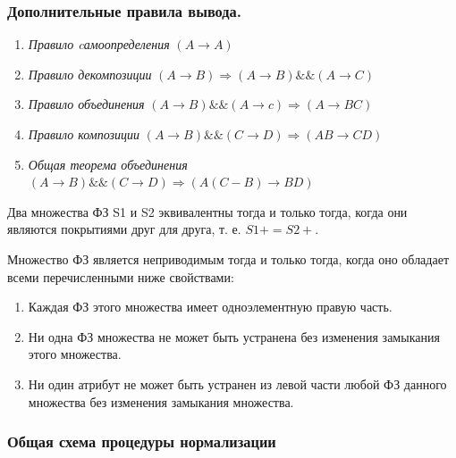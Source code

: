 \subsubsection{Дополнительные правила вывода.}

\begin{enumerate}
	\item \textit{Правило cамоопределения} $(A \to A)$
	\item \textit{Правило декомпозиции} $(A \to B) \Rightarrow (A \to B) \&\& (A \to C)$
	\item \textit{Правило объединения} $(A \to B) \&\& (A \to c) \Rightarrow (A \to BC)$
	\item \textit{Правило композиции} $(A \to B) \&\& (C \to D) \Rightarrow (AB \to CD)$
	\item \textit{Общая теорема объединения} $(A \to B) \&\& (C \to D) \Rightarrow (A(C - B) \to BD)$
\end{enumerate}

Два множества ФЗ S1 и S2 эквивалентны тогда и только тогда, когда они являются покрытиями друг для друга, т. е. $S1+ = S2+$.

Множество ФЗ является неприводимым тогда и только тогда, когда оно обладает всеми перечисленными ниже свойствами:
\begin{enumerate}
	\item Каждая ФЗ этого множества имеет одноэлементную правую часть.
	\item Ни одна ФЗ множества не может быть устранена без изменения замыкания этого множества.
	\item Ни один атрибут не может быть устранен из левой части любой ФЗ данного множества без изменения замыкания множества.
\end{enumerate}

\clearpage

\subsubsection{Общая схема процедуры нормализации}

